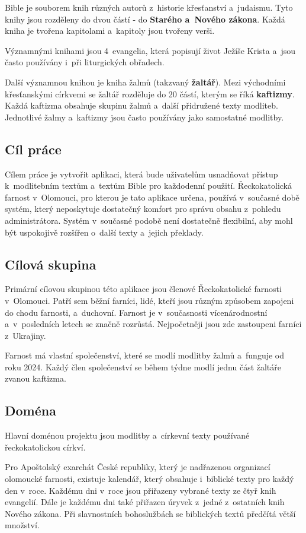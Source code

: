 \documentclass[
  tables=false,
  glossaries,
  index
]{kidiplom}
\begin{document}
Bible je souborem knih různých autorů z~historie křesťanství a~judaismu. Tyto knihy jsou rozděleny do dvou částí - do \textbf{Starého a~Nového  zákona}. Každá kniha je tvořena kapitolami a~kapitoly jsou tvořeny verši.

Významnými knihami jsou 4~evangelia, která popisují život Ježíše Krista a~jsou často používány i~při liturgických obřadech.

Další významnou knihou je kniha žalmů (takzvaný \textbf{žaltář}). Mezi východními křesťanskými církvemi se žaltář rozděluje do 20 částí, kterým se říká \textbf{kaftizmy}. Každá kaftizma obsahuje skupinu žalmů a~další přidružené texty modliteb. Jednotlivé žalmy a~kaftizmy jsou často používány jako samostatné modlitby.

\subsection{Cíl práce}
Cílem práce je vytvořit aplikaci, která bude uživatelům usnadňovat přístup k~modlitebním textům a~textům Bible pro každodenní použití. Řeckokatolická farnost v~Olomouci, pro kterou je tato aplikace určena, používá v~současné době systém, který neposkytuje dostatečný komfort pro správu obsahu z~pohledu administrátora. Systém v~současné podobě není dostatečně flexibilní, aby mohl být uspokojivě rozšířen o~další texty a~jejich překlady.

\subsection{Cílová skupina}
Primární cílovou skupinou této aplikace jsou členové Řeckokatolické farnosti v~Olomouci. Patří sem běžní farníci, lidé, kteří jsou různým způsobem zapojeni do chodu farnosti, a~duchovní. Farnost je v~současnosti vícenárodnostní a~v~posledních letech se značně
rozrůstá. Nejpočetněji jsou zde zastoupeni farníci z~Ukrajiny.

Farnost má vlastní společenství, které se modlí modlitby žalmů a~funguje od
roku 2024. Každý člen společenství se během týdne modlí jednu část žaltáře zvanou kaftizma.

\subsection{Doména}
Hlavní doménou projektu jsou modlitby a~církevní texty používané řeckokatolickou církví.

Pro Apoštolský exarchát České republiky, který je nadřazenou organizací olomoucké farnosti, existuje kalendář, který obsahuje i~biblické texty pro každý den v~roce. Každému dni v~roce jsou přiřazeny vybrané texty ze čtyř knih evangelií. Dále je každému dni také přiřazen úryvek z~jedné z~ostatních knih Nového zákona. Při slavnostních bohoslužbách se biblických textů předčítá větší množství.
\end{document}
